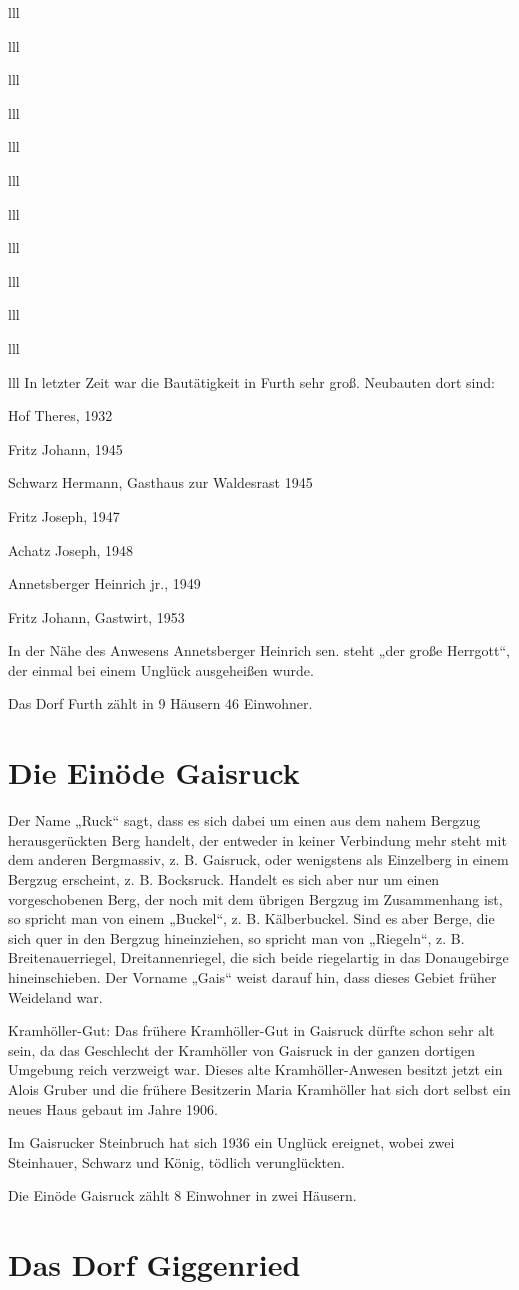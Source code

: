 \documentclass[12pt,a4pager]{book}
\begin{document}
\begin{tabuluar}{lll}
\begin{tabuluar}{lll}
\begin{tabuluar}{lll}
\begin{tabuluar}{lll}
\begin{tabuluar}{lll}
\begin{tabuluar}{lll}
\begin{tabuluar}{lll}
\begin{tabuluar}{lll}
\begin{tabuluar}{lll}
\begin{tabuluar}{lll}
\begin{tabuluar}{lll}
\begin{tabuluar}{lll}
In letzter Zeit war die Bautätigkeit in Furth sehr groß. Neubauten dort sind:

Hof Theres, 1932

Fritz Johann, 1945

Schwarz Hermann, Gasthaus zur Waldesrast 1945

Fritz Joseph, 1947

Achatz Joseph, 1948

Annetsberger Heinrich jr., 1949

Fritz Johann, Gastwirt, 1953

In der Nähe des Anwesens Annetsberger Heinrich sen. steht „der große Herrgott“,
der einmal bei einem Unglück ausgeheißen wurde.

Das Dorf Furth zählt in 9 Häusern 46 Einwohner.

\section{Die Einöde Gaisruck}

Der Name „Ruck“ sagt, dass es sich dabei um einen aus dem nahem Bergzug
herausgerückten Berg handelt, der entweder in keiner Verbindung mehr steht mit
dem anderen Bergmassiv, z. B. Gaisruck, oder wenigstens als Einzelberg in einem
Bergzug erscheint, z. B. Bocksruck. Handelt es sich aber nur um einen
vorgeschobenen Berg, der noch mit dem übrigen Bergzug im Zusammenhang ist, so
spricht man von einem „Buckel“, z. B. Kälberbuckel. Sind es aber Berge, die sich
quer in den Bergzug hineinziehen, so spricht man von „Riegeln“, z. B.
Breitenauerriegel, Dreitannenriegel, die sich beide riegelartig in das
Donaugebirge hineinschieben. Der Vorname „Gais“ weist darauf hin, dass dieses
Gebiet früher Weideland war.

Kramhöller-Gut: Das frühere Kramhöller-Gut in Gaisruck dürfte schon sehr alt
sein, da das Geschlecht der Kramhöller von Gaisruck in der ganzen dortigen
Umgebung reich verzweigt war. Dieses alte Kramhöller-Anwesen besitzt jetzt ein
Alois Gruber und die frühere Besitzerin Maria Kramhöller hat sich dort selbst
ein neues Haus gebaut im Jahre 1906.

Im Gaisrucker Steinbruch hat sich 1936 ein Unglück ereignet, wobei zwei
Steinhauer, Schwarz und König, tödlich verunglückten.

Die Einöde Gaisruck zählt 8 Einwohner in zwei Häusern.

\section{Das Dorf Giggenried}


\end{tabuluar}
\end{tabuluar}
\end{tabuluar}
\end{tabuluar}
\end{tabuluar}
\end{tabuluar}
\end{tabuluar}
\end{tabuluar}
\end{tabuluar}
\end{tabuluar}
\end{tabuluar}
\end{tabuluar}
\end{document}
